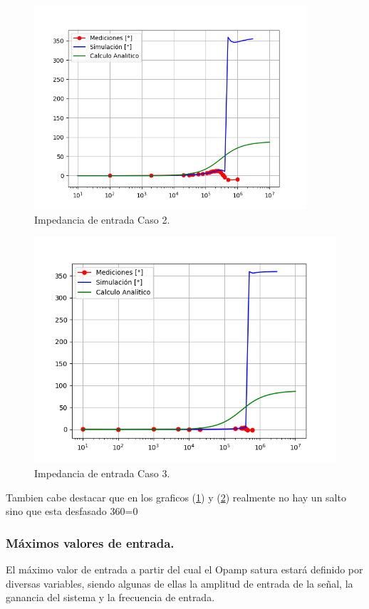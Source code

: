 \begin{figure}[H]	
	\centering
	\includegraphics[width=0.9\textwidth]{Ejercicio1/Imagenes/ZinphC2.png}
	\caption{Impedancia de entrada Caso 2.}
	\label{fig:CompZinphC2}
\end{figure} 
\begin{figure}[H]	
	\centering
	\includegraphics[width=\textwidth]{Ejercicio1/Imagenes/ZinphC3.png}
	\caption{Impedancia de entrada Caso 3.}
	\label{fig:CompZinphC3}
\end{figure} 
Tambien cabe destacar que en los graficos (\ref{fig:CompZinphC2}) y (\ref{fig:CompZinphC3}) realmente no hay un salto sino que esta desfasado 360=0
\subsubsection{Máximos valores de entrada.}
El máximo valor de entrada a partir del cual el Opamp satura estará definido por diversas variables, siendo algunas de ellas la amplitud de entrada de la señal, la ganancia del sistema y la frecuencia de entrada.

